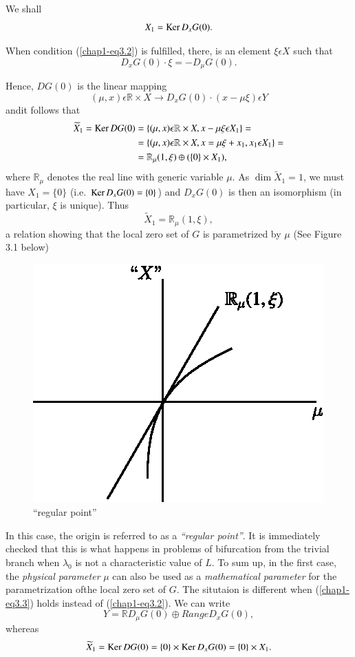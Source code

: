 We shall
$$
X_{1} = \operatorname{Ker} D_{x}G(0).
$$

When condition (\ref{chap1-eq3.2}) is fulfilled, there, is an element $\xi \epsilon X$ such that
$$
D_{x}G(0) \cdot \xi = -D_{\mu}G(0).
$$

Hence, $DG(0)$ is the linear mapping
$$
(\mu, x) \epsilon \mathbb{R} \times X \to D_{x}G(0) \cdot (x - \mu \xi) \epsilon Y
$$
and\pageoriginale it follows that
\begin{align*}
\widetilde{X}_{1} = \operatorname{Ker} DG(0) & = \{(\mu, x) \epsilon \mathbb{R} \times X, x - \mu \xi \epsilon X_{1} \} = \\
& = \{(\mu, x) \epsilon \mathbb{R} \times X, x = \mu \xi + x_{1}, x_{1} \epsilon X_{1} \} = \\
&  = \mathbb{R}_{\mu} (1, \xi) \oplus (\{0\} \times X_{1}),
\end{align*}
where $\mathbb{R}_{\mu}$ denotes the real line with generic variable $\mu$. As $\dim \widetilde{X}_{1} = 1$, we must have $X_{1} = \{0\}$ (i.e. $\operatorname{Ker} D_{x}G(0) = \{0\}$) and $D_{x}G(0)$ is then an isomorphism (in particular, $\xi$ is unique). Thus
$$
\widetilde{X}_{1} = \mathbb{R}_{\mu}(1, \xi),
$$
a relation showing that the local zero set of $G$ is parametrized by $\mu$ (See Figure 3.1 below)
\begin{figure}[H]
\centering
\includegraphics{figure/fig76-3.1.eps}
\caption{``regular point''}
\end{figure}

In this case, the origin is referred to as a {\em ``regular point''}. It is immediately checked that this is what happens in problems of bifurcation from the trivial branch when $\lambda_{0}$ is not a characteristic value of $L$. To sum up, in the first case, the {\em physical parameter} $\mu$ can also be used as a {\em mathematical parameter} for the parametrization of\pageoriginale the local zero set of $G$. The situtaion is different when (\ref{chap1-eq3.3}) holds instead of (\ref{chap1-eq3.2}). We can write
$$
Y = \mathbb{R}D_{\mu}G(0) \oplus Range D_{x}G(0),
$$
whereas
$$
\widetilde{X}_{1} = \operatorname{Ker} DG(0) = \{0\} \times \operatorname{Ker} D_{x}G(0) = \{0\} \times X_{1}.
$$

